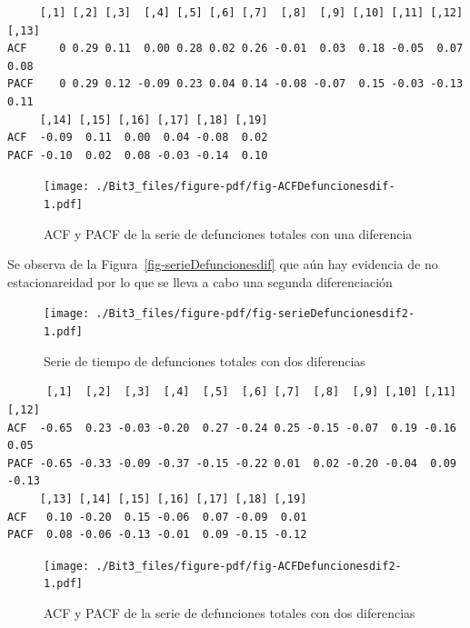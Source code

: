 \documentclass[
  letterpaper,
  onepage,
  openany]{report}
\begin{document}
\begin{verbatim}
     [,1] [,2] [,3]  [,4] [,5] [,6] [,7]  [,8]  [,9] [,10] [,11] [,12] [,13]
ACF     0 0.29 0.11  0.00 0.28 0.02 0.26 -0.01  0.03  0.18 -0.05  0.07  0.08
PACF    0 0.29 0.12 -0.09 0.23 0.04 0.14 -0.08 -0.07  0.15 -0.03 -0.13  0.11
     [,14] [,15] [,16] [,17] [,18] [,19]
ACF  -0.09  0.11  0.00  0.04 -0.08  0.02
PACF -0.10  0.02  0.08 -0.03 -0.14  0.10
\end{verbatim}

\begin{figure}[H]

{\centering \texttt{[image: ./Bit3\_files/figure-pdf/fig-ACFDefuncionesdif-1.pdf]}

}

\caption{\label{fig-ACFDefuncionesdif}ACF y PACF de la serie de
defunciones totales con una diferencia}

\end{figure}

Se observa de la Figura~\ref{fig-serieDefuncionesdif} que aún hay
evidencia de no estacionareidad por lo que se lleva a cabo una segunda
diferenciación

\begin{figure}[H]

{\centering \texttt{[image: ./Bit3\_files/figure-pdf/fig-serieDefuncionesdif2-1.pdf]}

}

\caption{\label{fig-serieDefuncionesdif2}Serie de tiempo de defunciones
totales con dos diferencias}

\end{figure}

\begin{verbatim}
      [,1]  [,2]  [,3]  [,4]  [,5]  [,6] [,7]  [,8]  [,9] [,10] [,11] [,12]
ACF  -0.65  0.23 -0.03 -0.20  0.27 -0.24 0.25 -0.15 -0.07  0.19 -0.16  0.05
PACF -0.65 -0.33 -0.09 -0.37 -0.15 -0.22 0.01  0.02 -0.20 -0.04  0.09 -0.13
     [,13] [,14] [,15] [,16] [,17] [,18] [,19]
ACF   0.10 -0.20  0.15 -0.06  0.07 -0.09  0.01
PACF  0.08 -0.06 -0.13 -0.01  0.09 -0.15 -0.12
\end{verbatim}

\begin{figure}[H]

{\centering \texttt{[image: ./Bit3\_files/figure-pdf/fig-ACFDefuncionesdif2-1.pdf]}

}

\caption{\label{fig-ACFDefuncionesdif2}ACF y PACF de la serie de
defunciones totales con dos diferencias}

\end{figure}
\end{document}
